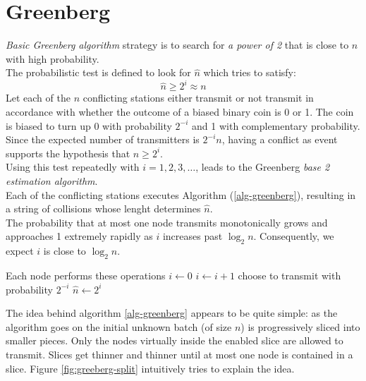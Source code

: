\documentclass[11pt,a4paper,twoside,openright]{book}
\newcommand{\algname}[1]{\ensuremath{\mbox{\sc #1}}}
\begin{document}
\section{Greenberg}


\emph{Basic Greenberg algorithm} strategy is to search for \emph{a power of 2} that is close to $n$ with high probability.\\
The probabilistic test is defined to look for $\hat{n}$ which tries to satisfy:\\
\begin{equation}
\hat{n}\geq 2^{i} \approx n
\end{equation}
Let each of the $n$ conflicting stations either transmit or not transmit in accordance with whether the outcome of a biased binary coin is 0 or 1. The coin is biased to turn up 0 with probability  $2^{-i}$ and 1 with complementary probability. Since the expected number of transmitters is $2^{-i}n$, having a conflict as event supports the hypothesis that $n\geq2^{i}$.\\
Using this test repeatedly with $i=1, 2, 3, \ldots$, leads to the Greenberg \emph{base 2 estimation algorithm}.\\
Each of the conflicting stations executes Algorithm (\ref{alg-greenberg}), resulting in a string of collisions whose lenght determines $\hat{n}$.\\

The probability that at most one node transmits monotonically grows and approaches 1 extremely rapidly as $i$ increases past $\log_{2}n$. Consequently, we expect $i$ is close to $\log_{2}n$.\\

\begin{algorithm}[H]
\begin{algorithmic}
\STATE \COMMENT Each node performs these operations
\STATE $i\gets 0$
\REPEAT
	\STATE $i\gets i+1$
	\STATE choose to transmit with probability $2^{-i}$
\STATE $\hat{n} \gets 2^{i}$
\end{algorithmic}
\caption{\algname{Basic Greenberg ($\mathcal{B}$)}}
\label{alg-greenberg}
\end{algorithm}

The idea behind algorithm \ref{alg-greenberg} appears to be quite simple: as the algorithm goes on the initial unknown batch (of size $n$) is progressively sliced into smaller pieces. Only the nodes virtually inside the enabled slice are allowed to transmit. Slices get thinner and thinner until at most one node is contained in a slice. Figure \ref{fig:greeberg-split} intuitively tries to explain the idea.\\ 
\end{document}
